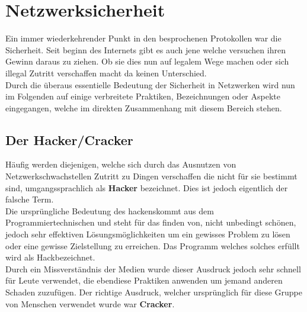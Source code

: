 \documentclass[12pt,a4paper]{report}
\begin{document}
\section{Netzwerksicherheit}\label{sec:security}
Ein immer wiederkehrender Punkt in den besprochenen Protokollen war die Sicherheit. Seit beginn des Internets gibt es auch jene welche versuchen ihren Gewinn daraus zu ziehen. Ob sie dies nun auf legalem Wege machen oder sich illegal Zutritt verschaffen macht da keinen Unterschied.\\

Durch die überaus essentielle Bedeutung der Sicherheit in Netzwerken wird nun im Folgenden auf einige verbreitete Praktiken, Bezeichnungen oder Aspekte eingegangen, welche im direkten Zusammenhang mit diesem Bereich stehen.
\subsection{Der Hacker/Cracker}
Häufig werden diejenigen, welche sich durch das Ausnutzen von Netzwerkschwachstellen Zutritt zu Dingen verschaffen die nicht für sie bestimmt sind, umgangssprachlich als \textbf{Hacker} bezeichnet. Dies ist jedoch eigentlich der falsche Term.\\

Die ursprüngliche Bedeutung des \glqq hackens\grqq kommt aus dem Programmiertechnischen und steht für das finden von, nicht unbedingt schönen, jedoch sehr effektiven Lösungsmöglichkeiten um ein gewisses Problem zu lösen oder eine gewisse Zielstellung zu erreichen. Das Programm welches solches erfüllt wird als \glqq Hack\grqq bezeichnet.\\
Durch ein Missverständnis der Medien wurde dieser Ausdruck jedoch sehr schnell für Leute verwendet, die ebendiese Praktiken anwenden um jemand anderen Schaden zuzufügen. Der richtige Ausdruck, welcher ursprünglich für diese Gruppe von Menschen verwendet wurde war \textbf{Cracker}.\\
\end{document}

